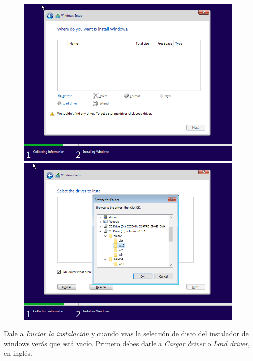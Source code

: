 \documentclass[12pt]{article}
\begin{document}
\begin{figure}[h]
\centering
\begin{minipage}[b]{0.4\textwidth}
\includegraphics[width=\textwidth]{images/windows-setup-01.png}
\end{minipage}
\hspace{10pt}
\begin{minipage}[b]{0.4\textwidth}
\includegraphics[width=\textwidth]{images/windows-setup-02.png}
\end{minipage}
\end{figure}

Dale a \emph{Iniciar la instalación} y cuando veas la selección de disco del instalador de windows verás que está vacío. Primero debes darle a \emph{Cargar driver} o \emph{Load driver}, en inglés.
\end{document}
